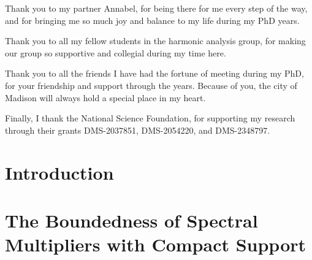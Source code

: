 \documentclass[12pt]{report}
\theoremstyle{plain}
\theoremstyle{remark}
\numberwithin{equation}{section}
\begin{document}
Thank you to my partner Annabel, for being there for me every step of the way, and for bringing me so much joy and balance to my life during my PhD years.

Thank you to all my fellow students in the harmonic analysis group, for making our group so supportive and collegial during my time here.

Thank you to all the friends I have had the fortune of meeting during my PhD, for your friendship and support through the years. Because of you, the city of Madison will always hold a special place in my heart.


Finally, I thank the National Science Foundation, for supporting my research through their grants DMS-2037851, DMS-2054220, and DMS-2348797.



\tableofcontents


\newpage
\doublespacing
{}


\chapter{Introduction}






\chapter{The Boundedness of Spectral Multipliers with Compact Support} \label{chap:boundedsinglefrequencyscale}

\end{document}
